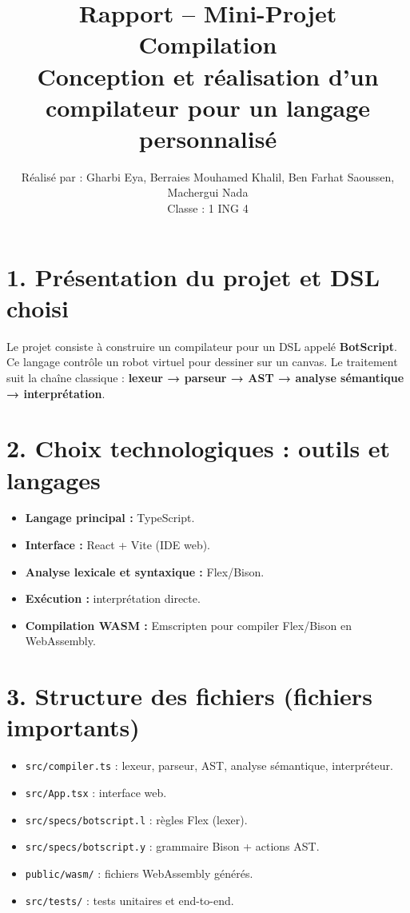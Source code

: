 \documentclass[11pt,a4paper]{article}
\title{\textbf{Rapport -- Mini-Projet Compilation}\\
Conception et réalisation d’un compilateur pour un langage personnalisé}
\author{Réalisé par : Gharbi Eya, Berraies Mouhamed Khalil, Ben Farhat Saoussen, Machergui Nada\\
Classe : 1 ING 4}
\date{}
\begin{document}
\maketitle

\section*{1. Présentation du projet et DSL choisi}
Le projet consiste à construire un compilateur pour un DSL appelé \textbf{BotScript}.  
Ce langage contrôle un robot virtuel pour dessiner sur un canvas.  
Le traitement suit la chaîne classique : \textbf{lexeur → parseur → AST → analyse sémantique → interprétation}.

\section*{2. Choix technologiques : outils et langages}
\begin{itemize}[leftmargin=1.2cm]
  \item \textbf{Langage principal :} TypeScript.
  \item \textbf{Interface :} React + Vite (IDE web).
  \item \textbf{Analyse lexicale et syntaxique :} Flex/Bison.
  \item \textbf{Exécution :} interprétation directe.
  \item \textbf{Compilation WASM :} Emscripten pour compiler Flex/Bison en WebAssembly.
\end{itemize}

\section*{3. Structure des fichiers (fichiers importants)}
\begin{itemize}[leftmargin=1.2cm]
  \item \texttt{src/compiler.ts} : lexeur, parseur, AST, analyse sémantique, interpréteur.
  \item \texttt{src/App.tsx} : interface web.
  \item \texttt{src/specs/botscript.l} : règles Flex (lexer).
  \item \texttt{src/specs/botscript.y} : grammaire Bison + actions AST.
  \item \texttt{public/wasm/} : fichiers WebAssembly générés.
  \item \texttt{src/tests/} : tests unitaires et end-to-end.
\end{itemize}
\end{document}

